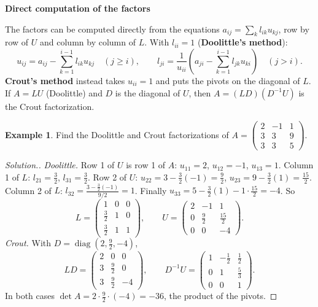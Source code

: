 \documentclass[11pt,a4paper]{article}
\numberwithin{equation}{section}
\theoremstyle{definition}
\newtheorem{exa}[thm]{Example}
\newenvironment{solution}
  {\renewcommand{\qedsymbol}{}\begin{proof}[\textit{Solution}.]}
  {\end{proof}}
\newcommand{\subhead}[1]{%
  \par\medskip\noindent\textbf{#1}\par\nobreak\smallskip}
\begin{document}
\subhead{Direct computation of the factors}
The factors can be computed directly from the equations $a_{ij} = \sum_kl_{ik}u_{kj}$, row by row of $U$ and column by column of $L$. With
$l_{ii} = 1$ (\textbf{Doolittle's method}):
$$u_{ij} = a_{ij}-\sum_{k=1}^{i-1}l_{ik}u_{kj}\quad(j\geq i),\qquad l_{ji} = \frac1{u_{ii}}\left(a_{ji}-\sum_{k=1}^{i-1}l_{jk}u_{ki}\right)\quad(j>i).$$
\textbf{Crout's method} instead takes $u_{ii} = 1$ and puts the pivots on the diagonal of $L$. If $A = LU$ (Doolittle) and $D$ is the
diagonal of $U$, then $A = (LD)(D^{-1}U)$ is the Crout factorization.

\begin{exa}
\label{exa:crout}
Find the Doolittle and Crout factorizations of $A = \begin{pmatrix}2&-1&1\\3&3&9\\3&3&5\end{pmatrix}$.
\end{exa}

\begin{solution}
\emph{Doolittle.} Row 1 of $U$ is row 1 of $A$: $u_{11} = 2$, $u_{12} = -1$, $u_{13} = 1$. Column 1 of $L$: $l_{21} = \frac32$, $l_{31} = \frac32$.
Row 2 of $U$: $u_{22} = 3-\frac32(-1) = \frac92$, $u_{23} = 9-\frac32(1) = \frac{15}{2}$. Column 2 of $L$:
$l_{32} = \frac{3-\frac32(-1)}{9/2} = 1$. Finally $u_{33} = 5-\frac32(1)-1\cdot\frac{15}{2} = -4$. So
$$L = \begin{pmatrix}1&0&0\\\frac32&1&0\\\frac32&1&1\end{pmatrix},\qquad U = \begin{pmatrix}2&-1&1\\0&\frac92&\frac{15}2\\0&0&-4\end{pmatrix}.$$
\emph{Crout.} With $D = \operatorname{diag}(2,\frac92,-4)$,
$$LD = \begin{pmatrix}2&0&0\\3&\frac92&0\\3&\frac92&-4\end{pmatrix},\qquad D^{-1}U = \begin{pmatrix}1&-\frac12&\frac12\\0&1&\frac53\\0&0&1\end{pmatrix}.$$
In both cases $\det A = 2\cdot\frac92\cdot(-4) = -36$, the product of the pivots.
\end{solution}
\end{document}
